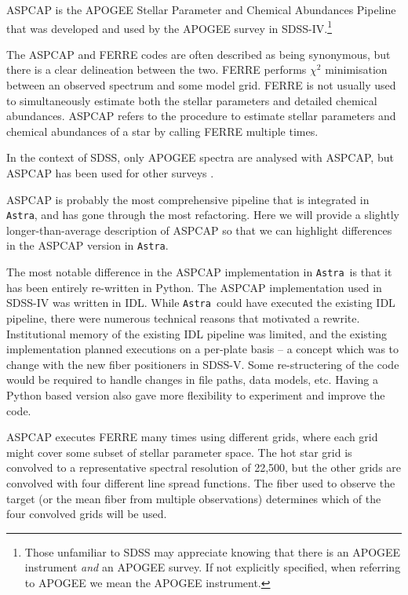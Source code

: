 \documentclass[modern]{aastex631}
\newcommand{\astra}{\texttt{Astra}}
\newcommand{\Astra}{\astra}
\begin{document}
ASPCAP is the APOGEE Stellar Parameter and Chemical Abundances Pipeline \citep{aspcap} that was developed and used by the APOGEE survey in SDSS-IV.\footnote{Those unfamiliar to SDSS may appreciate knowing that there is an APOGEE instrument \emph{and} an APOGEE survey. If not explicitly specified, when referring to APOGEE we mean the APOGEE instrument.}


The ASPCAP and FERRE codes are often described as being synonymous, but there is a clear delineation between the two. FERRE \citep[and Section \ref{sec:methods-ferre}][]{ferre} performs $\chi^2$ minimisation between an observed spectrum and some model grid. FERRE is not usually used to simultaneously estimate both the stellar parameters and detailed chemical abundances. ASPCAP refers to the procedure to estimate stellar parameters and chemical abundances of a star by calling FERRE multiple times.

In the context of SDSS, only APOGEE spectra are analysed with ASPCAP, but ASPCAP has been used for other surveys \citep{who}. 


ASPCAP is probably the most comprehensive pipeline that is integrated in \Astra, and has gone through the most refactoring. Here we will provide a slightly longer-than-average description of ASPCAP so that we can highlight differences in the ASPCAP version in \Astra.

The most notable difference in the ASPCAP implementation in \Astra\ is that it has been entirely re-written in Python. The ASPCAP implementation used in SDSS-IV was written in IDL. While \Astra\ could have executed the existing IDL pipeline, there were numerous technical reasons that motivated a rewrite. Institutional memory of the existing IDL pipeline was limited, and the existing implementation planned executions on a per-plate basis -- a concept which was to change with the new fiber positioners in SDSS-V. Some re-structering of the code would be required to handle changes in file paths, data models, etc. Having a Python based version also gave more flexibility to experiment and improve the code. 


ASPCAP executes FERRE many times using different grids, where each grid might cover some subset of stellar parameter space. The hot star grid is convolved to a representative spectral resolution of 22,500, but the other grids are convolved with four different line spread functions. The fiber used to observe the target (or the mean fiber from multiple observations) determines which of the four convolved grids will be used.
\end{document}
